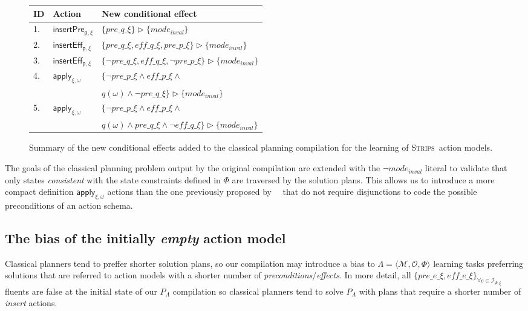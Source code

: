 \documentclass{article}
\newcommand{\tup}[1]{{\langle #1 \rangle}}
\newcommand{\strips}{\textsc{Strips}}
\begin{document}
\begin{figure}
\begin{tabular}{lll}
{\bf ID} & {\bf Action} & {\bf New conditional effect}\\\hline
1.& $\mathsf{insertPre_{p,\xi}}$ & $\{pre\_q\_\xi\}\rhd\{mode_{inval}\}$\\
2.& $\mathsf{insertEff_{p,\xi}}$ & $\{pre\_q\_\xi,eff\_q\_\xi,pre\_p\_\xi\}\rhd\{mode_{inval}\}$\\
3.& $\mathsf{insertEff_{p,\xi}}$ & $\{\neg pre\_q\_\xi,eff\_q\_\xi,\neg pre\_p\_\xi\}\rhd\{mode_{inval}\}$\\
4.& $\mathsf{apply_{\xi,\omega}}$ & $\{\neg pre\_p\_\xi \wedge eff\_p\_\xi \wedge $\\
& & $q(\omega)\wedge \neg pre\_q\_\xi\}\rhd\{mode_{inval}\}$\\
5.& $\mathsf{apply_{\xi,\omega}}$ & $\{\neg pre\_p\_\xi \wedge eff\_p\_\xi \wedge $\\
& &$q(\omega)\wedge pre\_q\_\xi \wedge \neg eff\_q\_\xi\}\rhd\{mode_{inval}\}$
\end{tabular}
	\caption{\small Summary of the new conditional effects added to the classical planning compilation for the learning of \strips\ action models.}
	\label{fig:ceffects}
\end{figure}

The goals of the classical planning problem output by the original compilation are extended with the $\neg mode_{inval}$ literal to validate that only states {\em consistent} with the state constraints defined in $\Phi$ are traversed by the solution plans. This allows us to introduce a more compact definition $\mathsf{apply_{\xi,\omega}}$ actions than the one previously proposed by~\citeauthor{aineto2018learning}~\citeyear{aineto2018learning} that do not require disjunctions to code the possible preconditions of an action schema.




\subsection{The bias of the initially {\em empty} action model}
Classical planners tend to preffer shorter solution plans, so our compilation may introduce a bias to $\Lambda=\tup{\mathcal{M},{\mathcal O},\Phi}$ learning tasks preferring solutions that are referred to action models with a shorter number of {\em preconditions}/{\em effects}. In more detail, all $\{pre\_e\_\xi, eff\_e\_\xi\}_{\forall e\in{\mathcal I}_{\Psi,\xi}}$ fluents are false at the initial state of our $P_\Lambda$ compilation so classical planners tend to solve $P_\Lambda$ with plans that require a shorter number of {\em insert} actions.
\end{document}
